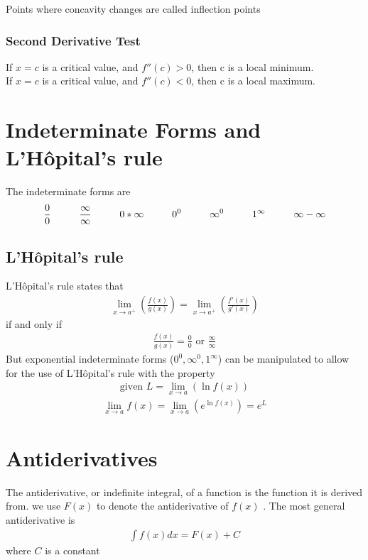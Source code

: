 \documentclass{article}
\newcommand\tab[1][1cm]{\hspace*{#1}}
\newcommand\limxa{\lim_{x\to a}}
\newcommand\limxar{\lim_{x\to a^+}}
\newcommand\fx{\(f(x)\) }
\begin{document}
        Points where concavity changes are called inflection points
        \subsubsection{Second Derivative Test}
            If \(x=c\) is a critical value, and \(f''(c) > 0\), then c is a local minimum.\\
            If \(x=c\) is a critical value, and \(f''(c) < 0\), then c is a local maximum. 
\section{Indeterminate Forms and L'Hôpital's rule}
    The indeterminate forms are 
    \begin{gather*}
        \frac{0}{0}\tab \frac{\infty}{\infty}\tab 0*\infty\tab 0^0\tab \infty^0\tab 1^\infty\tab \infty - \infty
    \end{gather*}
    
    \subsection{L'Hôpital's rule}
        L'Hôpital's rule states that
        \begin{gather*}
            \limxar\left(\frac{f(x)}{g(x)}\right)=\limxar\left(\frac{f'(x)}{g'(x)}\right)
        \end{gather*}
        if and only if
        \begin{gather*}
            \frac{f(x)}{g(x)} = \frac{0}{0} \text{ or } \frac{\infty}{\infty}
        \end{gather*}
        But exponential indeterminate forms (\(0^0, \infty^0, 1^\infty\)) can be manipulated to allow for the use of L'Hôpital's rule with the property
        \begin{gather*}
            \text{given } L=\limxa\left(\ln f(x)\right)
        \end{gather*}
        \begin{gather*}
            \limxa f(x) = \limxa \left(e^{\ln f(x)}\right) = e^L
        \end{gather*}
\section{Antiderivatives}
    The antiderivative, or indefinite integral, of a function is the function it is derived from. we use \(F(x)\) to denote the antiderivative of \fx. The most general antiderivative is 
    \begin{gather*}
        \int f(x)dx = F(x) + C
    \end{gather*}
    where \(C\) is a constant
\end{document}
